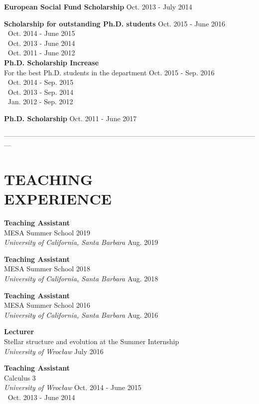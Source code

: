 \documentclass[margin, 10pt]{res} %
\begin{document}
\begin{resume}
{\bf European Social Fund Scholarship} \hfill Oct. 2013 - July 2014

{\bf Scholarship for outstanding Ph.D. students} \hfill Oct. 2015 - June 2016 \\
$~$ \hfill Oct. 2014 - June 2015 \\
$~$ \hfill Oct. 2013 - June 2014 \\
$~$ \hfill Oct. 2011 - June 2012 \\

{\bf Ph.D. Scholarship Increase} \\
For the best Ph.D. students in the department \hfill Oct. 2015 - Sep. 2016 \\
$~$ \hfill Oct. 2014 - Sep. 2015 \\
$~$ \hfill Oct. 2013 - Sep. 2014 \\
$~$ \hfill Jan. 2012 - Sep. 2012

{\bf Ph.D. Scholarship}  \hfill Oct. 2011 - June 2017

---------------------------------------------------------------------------------------------------------------

\section{TEACHING \\ EXPERIENCE}  

{\bf Teaching Assistant} \\
MESA Summer School 2019 \\
{\sl University of California, Santa Barbara} \hfill Aug. 2019

{\bf Teaching Assistant} \\
MESA Summer School 2018 \\
{\sl University of California, Santa Barbara} \hfill Aug. 2018

{\bf Teaching Assistant} \\
MESA Summer School 2016 \\
{\sl University of California, Santa Barbara} \hfill Aug. 2016

{\bf Lecturer} \\
Stellar structure and evolution at the Summer Internship \\
{\sl University of Wroc\l{}aw} \hfill July 2016

{\bf Teaching Assistant} \\
Calculus 3 \\
{\sl University of Wroc\l{}aw }\hfill Oct. 2014 - June 2015 \\
$~$ \hfill Oct. 2013 - June 2014


\end{resume}
\end{document}
